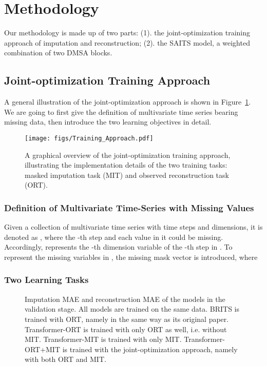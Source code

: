 \documentclass{article}
\begin{document}
\section{Methodology} \label{methodology}
Our methodology is made up of two parts: (1). the joint-optimization training approach of imputation and reconstruction; (2). the SAITS model, a weighted combination of two DMSA blocks.

\subsection{Joint-optimization Training Approach} \label{methodology: joint-optimization approach}
A general illustration of the joint-optimization approach is shown in Figure~\ref{fig0}. We are going to first give the definition of multivariate time series bearing missing data, then introduce the two learning objectives in detail.

\begin{figure}[!htb]
	\centering
	\texttt{[image: figs/Training\_Approach.pdf]}
	\caption{A graphical overview of the joint-optimization training approach, illustrating the implementation details of the two training tasks: masked imputation task (MIT) and observed reconstruction task (ORT).}
	\label{fig0}
\end{figure}

\subsubsection{Definition of Multivariate Time-Series with Missing Values}
Given a collection of multivariate time series with  time steps and  dimensions, it is denoted as , where the -th step  and each value in it could be missing. Accordingly,  represents the -th dimension variable of the -th step in . To represent the missing variables in , the missing mask vector  is introduced, where 



\subsubsection{Two Learning Tasks}
\begin{figure}[!b]
	\centering
	\caption{Imputation MAE and reconstruction MAE of the models in the validation stage. All models are trained on the same data. BRITS is trained with ORT, namely in the same way as its original paper. Transformer-ORT is trained with only ORT as well, i.e. without MIT. Transformer-MIT is trained with only MIT. Transformer-ORT+MIT is trained with the joint-optimization approach, namely with both ORT and MIT.}
	\label{fig1}
\end{figure}
\end{document}
